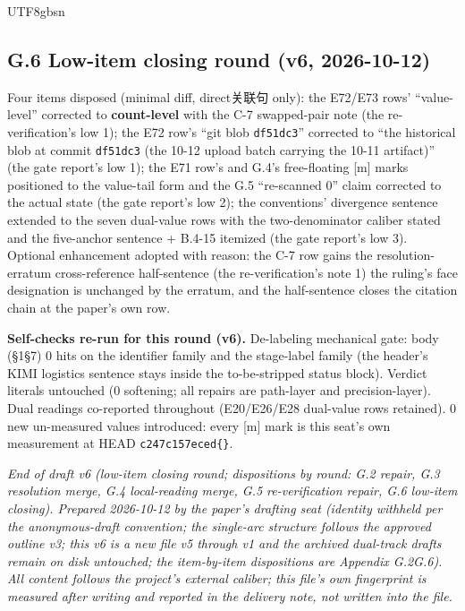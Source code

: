\documentclass[11pt,letterpaper]{article}
\begin{document}
\begin{CJK}{UTF8}{gbsn}
\subsection*{G.6 Low-item closing round (v6, 2026-10-12)}

Four items disposed (minimal diff, direct关联句 only): the E72/E73 rows' ``value-level'' corrected to \textbf{count-level} with the C-7 swapped-pair note (the re-verification's low 1); the E72 row's ``git blob \texttt{df51dc3}'' corrected to ``the historical blob at commit \texttt{df51dc3} (the 10-12 upload batch carrying the 10-11 artifact)'' (the gate report's low 1); the E71 row's and G.4's free-floating [m] marks positioned to the value-tail form and the G.5 ``re-scanned 0'' claim corrected to the actual state (the gate report's low 2); the conventions' divergence sentence extended to the seven dual-value rows with the two-denominator caliber stated and the five-anchor sentence + B.4-15 itemized (the gate report's low 3). Optional enhancement adopted with reason: the C-7 row gains the resolution-erratum cross-reference half-sentence (the re-verification's note 1) \textemdash{} the ruling's face designation is unchanged by the erratum, and the half-sentence closes the citation chain at the paper's own row.

\textbf{Self-checks re-run for this round (v6).} De-labeling mechanical gate: body (\S{}1\textendash{}\S{}7) 0 hits on the identifier family and the stage-label family (the header's KIMI logistics sentence stays inside the to-be-stripped status block). Verdict literals untouched (0 softening; all repairs are path-layer and precision-layer). Dual readings co-reported throughout (E20/E26/E28 dual-value rows retained). 0 new un-measured values introduced: every [m] mark is this seat's own measurement at HEAD \texttt{c247c157eced\textellipsis\{\}}.

\emph{End of draft v6 (low-item closing round; dispositions by round: G.2 repair, G.3 resolution merge, G.4 local-reading merge, G.5 re-verification repair, G.6 low-item closing). Prepared 2026-10-12 by the paper's drafting seat (identity withheld per the anonymous-draft convention; the single-arc structure follows the approved outline v3; this v6 is a new file \textemdash{} v5 through v1 and the archived dual-track drafts remain on disk untouched; the item-by-item dispositions are Appendix G.2\textendash{}G.6). All content follows the project's external caliber; this file's own fingerprint is measured after writing and reported in the delivery note, not written into the file.}


\end{CJK}
\end{document}

